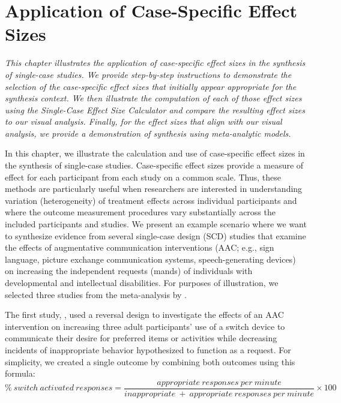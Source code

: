 \documentclass[
]{book}
\begin{document}
\hypertarget{app-case-specific-es}{%
\chapter{Application of Case-Specific Effect Sizes}\label{app-case-specific-es}}


\emph{This chapter illustrates the application of case-specific effect sizes in the synthesis of single-case studies. We provide step-by-step instructions to demonstrate the selection of the case-specific effect sizes that initially appear appropriate for the synthesis context. We then illustrate the computation of each of those effect sizes using the Single-Case Effect Size Calculator and compare the resulting effect sizes to our visual analysis. Finally, for the effect sizes that align with our visual analysis, we provide a demonstration of synthesis using meta-analytic models.}

In this chapter, we illustrate the calculation and use of case-specific effect sizes in the synthesis of single-case studies. Case-specific effect sizes provide a measure of effect for each participant from each study on a common scale. Thus, these methods are particularly useful when researchers are interested in understanding variation (heterogeneity) of treatment effects across individual participants and where the outcome measurement procedures vary substantially across the included participants and studies. We present an example scenario where we want to synthesize evidence from several single-case design (SCD) studies that examine the effects of augmentative communication interventions (AAC; e.g., sign language, picture exchange communication systems, speech-generating devices) on increasing the independent requests (mands) of individuals with developmental and intellectual disabilities. For purposes of illustration, we selected three studies from the meta-analysis by \citep{Ganz_et_al_2023}.

The first study, \citet{Byiers2014}, used a reversal design to investigate the effects of an AAC intervention on increasing three adult participants' use of a switch device to communicate their desire for preferred items or activities while decreasing incidents of inappropriate behavior hypothesized to function as a request. For simplicity, we created a single outcome by combining both outcomes using this formula:
\begin{equation}
\label{eq:Byiers-out-formula}
\% \ switch \ activated \ responses = \frac{appropriate \ responses \ per \ minute}{inappropriate \ + \ appropriate \ responses \ per \ minute}\times 100
\end{equation}
\end{document}
